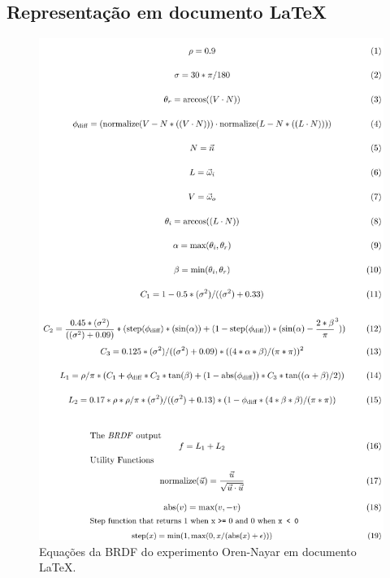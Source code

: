 \subsection{Representação em documento \LaTeX{}}
\begin{figure}[H]
    \caption{\label{fig-oren-nayar-eqlang-latex}
    \small Equações da BRDF do experimento Oren-Nayar em documento \LaTeX{}.}
    \begin{center}
        \includegraphics[scale=0.82]{./Imagens/brdfs/oren-nayar.pdf}
    \end{center}
\end{figure}

